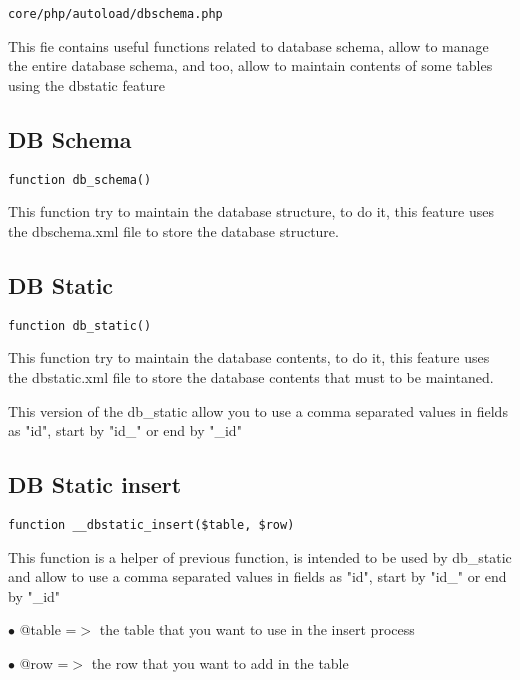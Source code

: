 \documentclass[a4paper]{book}
\begin{document}
\begin{lstlisting}
core/php/autoload/dbschema.php
\end{lstlisting}

This fie contains useful functions related to database schema, allow to manage the entire database
schema, and too, allow to maintain contents of some tables using the dbstatic feature

\hypertarget{toc82}{}
\subsection{DB Schema}

\begin{lstlisting}
function db_schema()
\end{lstlisting}

This function try to maintain the database structure, to do it, this feature uses the dbschema.xml
file to store the database structure.

\hypertarget{toc83}{}
\subsection{DB Static}

\begin{lstlisting}
function db_static()
\end{lstlisting}

This function try to maintain the database contents, to do it, this feature
uses the dbstatic.xml file to store the database contents that must to be
maintaned.

This version of the db\_static allow you to use a comma separated values in
fields as "id", start by "id\_" or end by "\_id"

\hypertarget{toc84}{}
\subsection{DB Static insert}

\begin{lstlisting}
function __dbstatic_insert($table, $row)
\end{lstlisting}

This function is a helper of previous function, is intended to be used by db\_static and
allow to use a comma separated values in fields as "id", start by "id\_" or end by "\_id"

\begin{compactitem}
\item[\color{myblue}$\bullet$] @table =$>$ the table that you want to use in the insert process
\item[\color{myblue}$\bullet$] @row   =$>$ the row that you want to add in the table
\end{compactitem}
\end{document}
